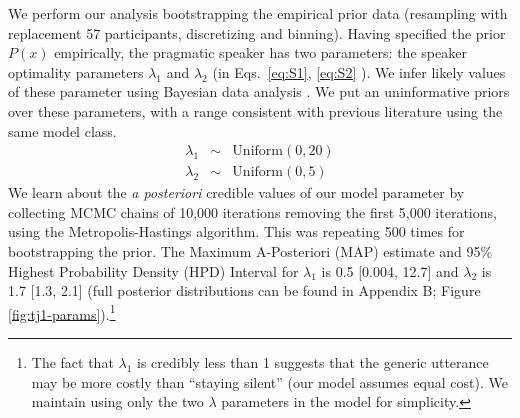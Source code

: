 \documentclass[12pt,letterpaper]{article}
\begin{document}
We perform our analysis bootstrapping the empirical prior data (resampling with replacement 57 participants, discretizing and binning). 
Having specified the prior $P(x)$ empirically, the pragmatic speaker has two parameters: the speaker optimality parameters $\lambda_1$ and $\lambda_2$ (in Eqs.~\ref{eq:S1}, \ref{eq:S2} ).
We infer likely values of these parameter using Bayesian data analysis \cite{LW2014}.
We put an uninformative priors over these parameters, with a range consistent with previous literature using the same model class.
%
\begin{eqnarray*}
\lambda_1 &\sim& \text{Uniform}(0,20) \\
\lambda_2 &\sim& \text{Uniform}(0,5)
\end{eqnarray*}
%
We learn about the \emph{a posteriori} credible values of our model parameter by collecting MCMC chains of 10,000 iterations removing the first 5,000 iterations, using the Metropolis-Hastings algorithm. 
This was repeating 500 times for bootstrapping the prior.
The Maximum A-Posteriori (MAP) estimate and 95\% Highest Probability Density (HPD) Interval for $\lambda_1$ is 0.5 [0.004, 12.7] and $\lambda_2$ is 1.7 [1.3, 2.1] (full posterior distributions can be found in Appendix B; Figure \ref{fig:tj1-params}).\footnote{
The fact that $\lambda_1$ is credibly less than 1 suggests that the generic utterance may be more costly than ``staying silent'' (our model assumes equal cost).
We maintain using only the two $\lambda$ parameters in the model for simplicity.
}
\end{document}
